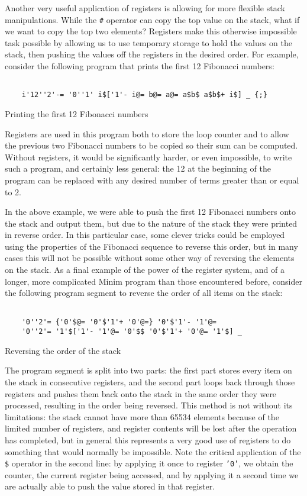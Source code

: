 \documentclass{article}
\begin{document}
Another very useful application of registers is allowing for more flexible stack manipulations. While the \texttt{\#} operator can copy the top value on the stack, what if we want to copy the top two elements? Registers make this otherwise impossible task possible by allowing us to use temporary storage to hold the values on the stack, then pushing the values off the registers in the desired order. For example, consider the following program that prints the first 12 Fibonacci numbers:
\begin{program}
	\begin{verbatim}
	
	i'12''2'-= '0''1' i$['1'- i@= b@= a@= a$b$ a$b$+ i$] _ {;}
	\end{verbatim}
	\caption{Printing the first 12 Fibonacci numbers}
\end{program}
Registers are used in this program both to store the loop counter and to allow the previous two Fibonacci numbers to be copied so their sum can be computed. Without registers, it would be significantly harder, or even impossible, to write such a program, and certainly less general: the 12 at the beginning of the program can be replaced with any desired number of terms greater than or equal to 2.

In the above example, we were able to push the first 12 Fibonacci numbers onto the stack and output them, but due to the nature of the stack they were printed in reverse order. In this particular case, some clever tricks could be employed using the properties of the Fibonacci sequence to reverse this order, but in many cases this will not be possible without some other way of reversing the elements on the stack. As a final example of the power of the register system, and of a longer, more complicated Minim program than those encountered before, consider the following program segment to reverse the order of all items on the stack:
\begin{program}
	\begin{verbatim}
	
	'0''2'= {'0'$@= '0'$'1'+ '0'@=} '0'$'1'- '1'@=
	'0''2'= '1'$['1'- '1'@= '0'$$ '0'$'1'+ '0'@= '1'$] _
	\end{verbatim}
	\caption{Reversing the order of the stack}
\end{program}
The program segment is split into two parts: the first part stores every item on the stack in consecutive registers, and the second part loops back through those registers and pushes them back onto the stack in the same order they were processed, resulting in the order being reversed. This method is not without its limitations: the stack cannot have more than 65534 elements because of the limited number of registers, and register contents will be lost after the operation has completed, but in general this represents a very good use of registers to do something that would normally be impossible. Note the critical application of the \texttt{\$} operator in the second line: by applying it once to register \texttt{'0'}, we obtain the counter, the current register being accessed, and by applying it a second time we are actually able to push the value stored in that register.
\end{document}
